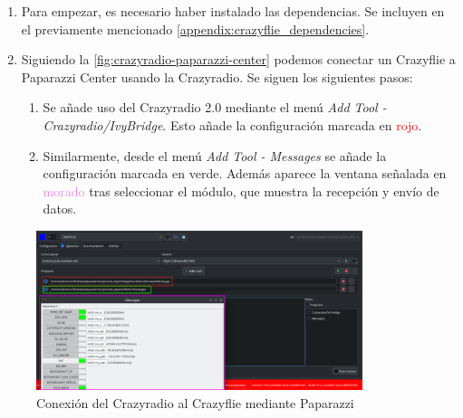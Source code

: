 \begin{enumerate}
    \item Para empezar, es necesario haber instalado las dependencias.
    Se incluyen en el previamente mencionado \autoref{appendix:crazyflie_dependencies}.

    \item Siguiendo la \autoref{fig:crazyradio-paparazzi-center} 
    podemos conectar un Crazyflie a Paparazzi Center usando la Crazyradio.
    Se siguen los siguientes pasos:

    \begin{enumerate}
        \item Se añade uso del Crazyradio 2.0 mediante el menú \textit{Add Tool - Crazyradio/IvyBridge}.
        Esto añade la configuración marcada en \textcolor{red}{rojo}.
        
        \item Similarmente, desde el menú \textit{Add Tool - Messages} se añade la configuración marcada en \textcolor{Green3}{verde}. 
        Además aparece la ventana señalada en \textcolor{violet}{morado} tras seleccionar el módulo, que muestra la recepción y envío de datos.
    \end{enumerate}
\end{enumerate}

\begin{figure}[!h]
    \centering
    \includegraphics[width=0.85\textwidth]{img/fig/fig2.8-radio-connection.png}
    \caption{Conexión del Crazyradio al Crazyflie mediante Paparazzi}
    \label{fig:crazyradio-paparazzi-center}
\end{figure}



